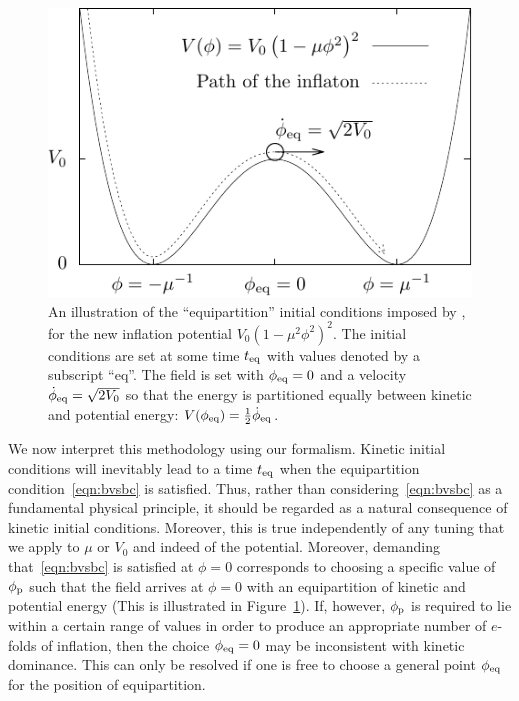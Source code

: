 %
\begin{figure}[ht]
  \includegraphics[width=\textwidth]{chapter_kinetic_dominance/figures/newpot}
  \caption{An illustration of the ``equipartition'' initial conditions imposed by \protect\citet{boyanovsky_cmb_2006}, for the new inflation potential $V_0{\left(1-\mu^2\phi^2\right)}^2$. The initial conditions are set at some time $t_{\mathrm{eq}}$ with values denoted by a subscript ``eq''. The field is set with $\phi_{\mathrm{eq}}=0$ and a velocity $\dot{\phi}_{\mathrm{eq}}= \sqrt{2V_0}$ so that the energy is partitioned equally between kinetic and potential energy: $V(\phi_{\mathrm{eq}}) = \frac{1}{2}\dot{\phi}_{\mathrm{eq}}$.\label{fig:figure_BVS_initial_conditions}}
\end{figure}
%

We now interpret this methodology using our formalism. Kinetic initial conditions will inevitably lead to a time $t_{\mathrm{eq}}$ when the equipartition condition~\eqref{eqn:bvsbc} is satisfied. Thus, rather than considering~\eqref{eqn:bvsbc} as a fundamental physical principle, it should be regarded as a natural consequence of kinetic initial conditions. Moreover, this is true independently of any tuning that we apply to $\mu$ or $V_0$ and indeed of the potential. Moreover, demanding that~\eqref{eqn:bvsbc} is satisfied at $\phi=0$ corresponds to choosing a specific value of $\phi_{\mathrm{p}}$ such that the field arrives at $\phi=0$ with an equipartition of kinetic and potential energy (This is illustrated in Figure~\ref{fig:figure_BVS_initial_conditions}).  If, however, $\phi_{\mathrm{p}}$ is required to lie within a certain range of values in order to produce an appropriate number of $e$-folds of inflation, then the choice $\phi_{\mathrm{eq}}=0$ may be inconsistent with kinetic dominance. This can only be resolved if one is free to choose a general point $\phi_{\mathrm{eq}}$ for the position of equipartition.  

